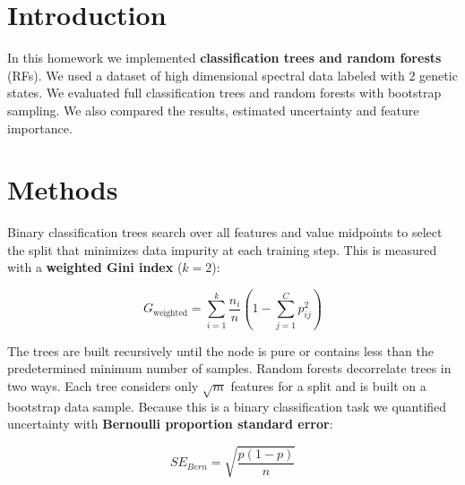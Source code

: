 \documentclass[fleqn,moreauthors,10pt]{ds_report}
\affiliation{\textit{ta5946@fri.uni-lj.si}}
\begin{document}
\flushbottom

\maketitle

\thispagestyle{empty}


\section*{Introduction}
    In this homework we implemented \textbf{classification trees and random forests} (RFs). We used a dataset of high dimensional spectral data labeled with 2 genetic states. We evaluated full classification trees and random forests with bootstrap sampling. We also compared the results, estimated uncertainty and feature importance. 


\section*{Methods}

Binary classification trees search over all features and value midpoints to select the split that minimizes data impurity at each training step. This is measured with a \textbf{weighted Gini index} ($k=2$):

\begin{equation}
G_{\text{weighted}} = \sum_{i=1}^{k} \frac{n_i}{n} \left(1 - \sum_{j=1}^{C} p_{ij}^2 \right)
\end{equation}

The trees are built recursively until the node is pure or contains less than the predetermined minimum number of samples. Random forests decorrelate trees in two ways. Each tree considers only $\sqrt{m}$ features for a split and is built on a bootstrap data sample. Because this is a binary classification task we quantified uncertainty with \textbf{Bernoulli proportion standard error}:

\begin{equation}
SE_{Bern} = \sqrt{\frac{p (1 - p)}{n}}
\end{equation}
\end{document}
